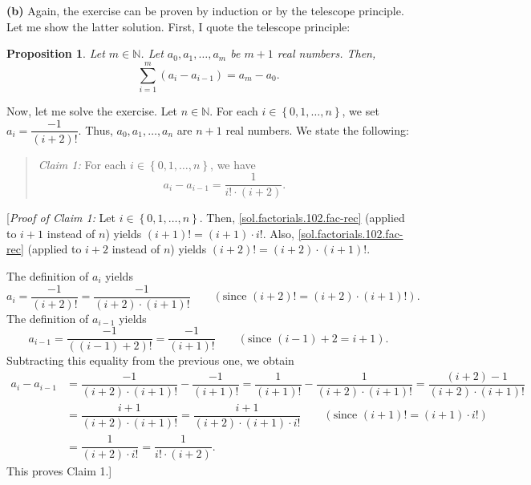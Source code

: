 \documentclass[paper=a4, fontsize=12pt]{scrartcl}%
\let\sumnonlimits\sum
\renewcommand{\sum}{\sumnonlimits\limits}
\theoremstyle{plainsl}
\newtheorem{proposition}[theorem]{Proposition}
\theoremstyle{definition}
\theoremstyle{remark}
\newenvironment{statement}{\begin{quote}}{\end{quote}}
\begin{document}
\textbf{(b)} Again, the exercise can be proven by induction or by the
telescope principle. Let me show the latter solution. First, I quote the
telescope principle:

\begin{proposition}
\label{prop.sums.telescope}Let $m\in\mathbb{N}$. Let $a_{0},a_{1},\ldots
,a_{m}$ be $m+1$ real numbers. Then,
\[
\sum_{i=1}^{m}\left(  a_{i}-a_{i-1}\right)  =a_{m}-a_{0}.
\]

\end{proposition}

Now, let me solve the exercise. Let $n\in\mathbb{N}$. For each $i\in\left\{
0,1,\ldots,n\right\}  $, we set $a_{i}=\dfrac{-1}{\left(  i+2\right)  !}$.
Thus, $a_{0},a_{1},\ldots,a_{n}$ are $n+1$ real numbers. We state the following:

\begin{statement}
\textit{Claim 1:} For each $i\in\left\{  0,1,\ldots,n\right\}  $, we have%
\[
a_{i}-a_{i-1}=\dfrac{1}{i!\cdot\left(  i+2\right)  }.
\]

\end{statement}

[\textit{Proof of Claim 1:} Let $i\in\left\{  0,1,\ldots,n\right\}  $. Then,
\eqref{sol.factorials.102.fac-rec} (applied to $i+1$ instead of $n$) yields
$\left(  i+1\right)  !=\left(  i+1\right)  \cdot i!$. Also,
\eqref{sol.factorials.102.fac-rec} (applied to $i+2$ instead of $n$) yields
$\left(  i+2\right)  !=\left(  i+2\right)  \cdot\left(  i+1\right)  !$.

The definition of $a_{i}$ yields%
\[
a_{i}=\dfrac{-1}{\left(  i+2\right)  !}=\dfrac{-1}{\left(  i+2\right)
\cdot\left(  i+1\right)  !}\qquad\left(  \text{since }\left(  i+2\right)
!=\left(  i+2\right)  \cdot\left(  i+1\right)  !\right)  .
\]
The definition of $a_{i-1}$ yields%
\[
a_{i-1}=\dfrac{-1}{\left(  \left(  i-1\right)  +2\right)  !}=\dfrac
{-1}{\left(  i+1\right)  !}\qquad\left(  \text{since }\left(  i-1\right)
+2=i+1\right)  .
\]
Subtracting this equality from the previous one, we obtain
\begin{align*}
a_{i}-a_{i-1}  &  =\dfrac{-1}{\left(  i+2\right)  \cdot\left(  i+1\right)
!}-\dfrac{-1}{\left(  i+1\right)  !}=\dfrac{1}{\left(  i+1\right)  !}%
-\dfrac{1}{\left(  i+2\right)  \cdot\left(  i+1\right)  !}=\dfrac{\left(
i+2\right)  -1}{\left(  i+2\right)  \cdot\left(  i+1\right)  !}\\
&  =\dfrac{i+1}{\left(  i+2\right)  \cdot\left(  i+1\right)  !}=\dfrac
{i+1}{\left(  i+2\right)  \cdot\left(  i+1\right)  \cdot i!}\qquad\left(
\text{since }\left(  i+1\right)  !=\left(  i+1\right)  \cdot i!\right) \\
&  =\dfrac{1}{\left(  i+2\right)  \cdot i!}=\dfrac{1}{i!\cdot\left(
i+2\right)  }.
\end{align*}
This proves Claim 1.]
\end{document}

